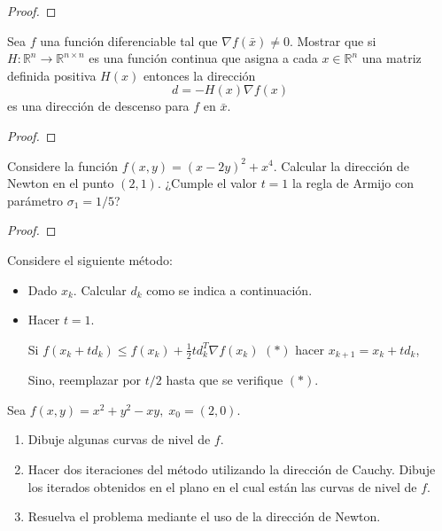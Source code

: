 \documentclass{article}
\newenvironment{theorem}[2][Ejercicio]{\begin{trivlist}
\item[\hskip \labelsep {\bfseries #1}\hskip \labelsep {\bfseries #2.}]}{\end{trivlist}}
\begin{document}
\begin{proof}

\end{proof}

\vspace{0.25in}

\begin{theorem}{4}
    Sea \(f\) una función diferenciable tal que \(\nabla f(\bar{x}) \neq 0\).
    Mostrar que si \(H : \mathbb{R}^n \to \mathbb{R}^{n \times n}\) es una función continua que asigna a
    cada \(x \in \mathbb{R}^n\) una matriz definida positiva \(H(x)\) entonces la dirección
    \[
        d = - H(x) \nabla f(x)
    \]
    es una dirección de descenso para \(f\) en \(\bar{x}\).
\end{theorem}

\begin{proof}

\end{proof}

\vspace{0.25in}

\begin{theorem}{5}
    Considere la función \( f(x,y) = {(x - 2y)}^2 + x^4 \).
    Calcular la dirección de Newton en el punto \((2,1)\).
    ¿Cumple el valor \(t = 1\) la regla de Armijo con parámetro \(\sigma_1 = 1/5\)?
\end{theorem}

\begin{proof}

\end{proof}
\vspace{0.25in}

\begin{theorem}{6}
    Considere el siguiente método:
    \begin{itemize}
        \item Dado \(x_k\). Calcular \(d_k\) como se indica a continuación.
        \item Hacer \(t = 1\).

              Si \( f(x_k + t d_k) \leq f(x_k) + \tfrac{1}{2} t d_k^T \nabla f(x_k) \) \((*)\) hacer
              \( x_{k+1} = x_k + t d_k \),

              Sino, reemplazar por \(t/2\) hasta que se verifique \((*)\).
    \end{itemize}

    Sea \( f(x,y) = x^2 + y^2 - xy, \; x_0 = (2,0) \).
    \begin{enumerate}
        \item[(a)] Dibuje algunas curvas de nivel de \(f\).
        \item[(b)] Hacer dos iteraciones del método utilizando la dirección de Cauchy. Dibuje los iterados obtenidos en el plano en el cual están las curvas de nivel de \(f\).
        \item[(c)] Resuelva el problema mediante el uso de la dirección de Newton.
    \end{enumerate}
\end{theorem}
\end{document}
